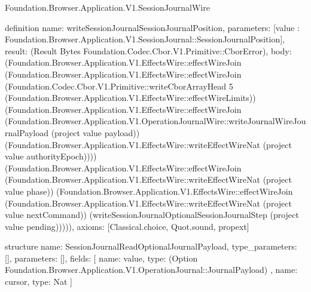 \begin{lexlean}{Foundation.Browser.Application.V1.SessionJournalWire}
\begin{semanticmodule}
definition{
  name: writeSessionJournalSessionJournalPosition,
  parameters: [value : Foundation.Browser.Application.V1.SessionJournal::SessionJournalPosition],
  result: (Result Bytes Foundation.Codec.Cbor.V1.Primitive::CborError),
  body: (Foundation.Browser.Application.V1.EffectsWire::effectWireJoin (Foundation.Browser.Application.V1.EffectsWire::effectWireJoin (Foundation.Codec.Cbor.V1.Primitive::writeCborArrayHead 5 (Foundation.Browser.Application.V1.EffectsWire::effectWireLimits)) (Foundation.Browser.Application.V1.EffectsWire::effectWireJoin (Foundation.Browser.Application.V1.OperationJournalWire::writeJournalWireJournalPayload (project value payload)) (Foundation.Browser.Application.V1.EffectsWire::writeEffectWireNat (project value authorityEpoch)))) (Foundation.Browser.Application.V1.EffectsWire::effectWireJoin (Foundation.Browser.Application.V1.EffectsWire::writeEffectWireNat (project value phase)) (Foundation.Browser.Application.V1.EffectsWire::effectWireJoin (Foundation.Browser.Application.V1.EffectsWire::writeEffectWireNat (project value nextCommand)) (writeSessionJournalOptionalSessionJournalStep (project value pending))))),
  axioms: [Classical.choice, Quot.sound, propext]
}

structure{
  name: SessionJournalReadOptionalJournalPayload,
  type_parameters: [],
  parameters: [],
  fields: [
    {
      name: value,
      type: (Option Foundation.Browser.Application.V1.OperationJournal::JournalPayload)
    },
    {name: cursor, type: Nat}
  ]
}


\end{semanticmodule}
\end{lexlean}
